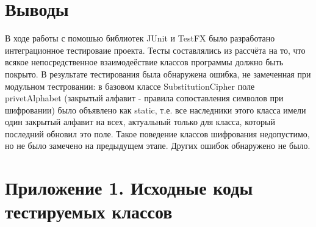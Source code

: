 \documentclass[a4paper,12pt]{article}
\begin{document}
\newpage\section{Выводы}
В ходе работы с помошью библиотек JUnit и TestFX было разработано интеграционное тестироваие проекта. Тесты составлялись из рассчёта на то, что всякое непосредственное взаимодеёствие классов программы должно быть покрыто. В результате тестирования была обнаружена ошибка, не замеченная при модульном тестровании: в базовом классе SubstitutionCipher поле privetAlphabet (закрытый алфавит - правила сопоставления символов при шифровании) было объявлено как static, т.е. все наследники этого класса имели один закрытый алфавит на всех, актуальный только для класса, который последний обновил это поле. Такое поведение классов шифрования недопустимо, но не было замечено на предыдущем этапе. Других ошибок обнаружено не было.
\newpage\section*{Приложение 1. Исходные коды тестируемых классов}
\end{document}
